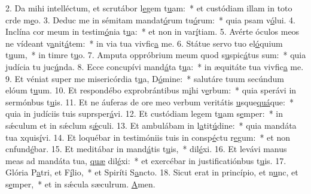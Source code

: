 2. Da mihi intelléctum, et scrutábor l\uline{e}gem t\uline{u}am:~* et custódiam illam in toto crde m\uline{e}o.
3. Deduc me in sémitam mandat\uline{ó}rum tu\uline{ó}rum:~* quia psam v\uline{ó}lui.
4. Inclína cor meum in testim\uline{ó}nia t\uline{u}a:~* et non in var\uline{í}tiam.
5. Avérte óculos meos ne vídeant v\uline{a}nit\uline{á}tem:~* in via tua vivfic\uline{a} me.
6. Státue servo tuo el\uline{ó}quium t\uline{u}um,~* in timre t\uline{u}o.
7. Amputa oppróbrium meum quod s\uline{u}spic\uline{á}tus sum:~* quia judícia tu juc\uline{ú}nda.
8. Ecce concupívi mand\uline{á}ta t\uline{u}a:~* in æquitáte tua vivfic\uline{a} me.
9. Et véniat super me misericórdia t\uline{u}a, D\uline{ó}mine:~* salutáre tuum secúndum elóum t\uline{u}um.
10. Et respondébo exprobrántibus m\uline{i}hi v\uline{e}rbum:~* quia sperávi in sermónbus t\uline{u}is.
11. Et ne áuferas de ore meo verbum veritátis \uline{u}sque\uline{quá}que:~* quia in judíciis tuis suprsper\uline{á}vi.
12. Et custódiam legem t\uline{u}am s\uline{e}mper:~* in sǽculum et in sǽclum s\uline{ǽ}culi.
13. Et ambulábam in l\uline{a}tit\uline{ú}dine:~* quia mandáta tua xquis\uline{í}vi.
14. Et loquébar in testimóniis tuis in consp\uline{é}ctu r\uline{e}gum:~* et non cnfund\uline{é}bar.
15. Et meditábar in mand\uline{á}tis t\uline{u}is,~*  dil\uline{é}xi.
16. Et levávi manus meas ad mandáta tua, \uline{quæ} dil\uline{é}xi:~* et exercébar in justificatiónbus t\uline{u}is.
17. Glória P\uline{a}tri, et F\uline{í}lio,~* et Spiríti S\uline{a}ncto.
18. Sicut erat in princípio, et n\uline{u}nc, et s\uline{e}mper,~* et in sǽcula sæculrum. \uline{A}men.

